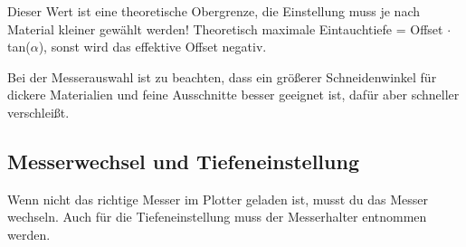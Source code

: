 \documentclass{\basedir/fablab-document}
\begin{document}
{ \footnotesize * Dieser Wert ist eine theoretische Obergrenze, die Einstellung muss je nach Material kleiner gewählt werden! Theoretisch maximale Eintauchtiefe = Offset $\cdot$ tan($\alpha$), sonst wird das effektive Offset negativ. }

Bei der Messerauswahl ist zu beachten, dass ein größerer Schneidenwinkel für dickere Materialien und feine Ausschnitte besser geeignet ist, dafür aber schneller verschleißt.
\newcommand{\messer}{
\shadedraw[left color=black!80!white!90!blue,right color=black!30!white] (-0.7,3) -- (-0.7,0) -- (-.2,0) -- (-.2,-2) -- (.7,0) -- (.7,3) -- cycle;
\fill[fill,color=black!20!white] (-.2,-2) -- (.7,0)  -- (.7,.3) --  (-.2,-1.7) -- cycle;
\draw[thick] (-0.7,3) -- (-0.7,0) -- (-.2,0) -- (-.2,-2) -- (.7,0) -- (.7,3) -- cycle;
}
\newcommand{\messerhalter}{
\draw[ultra thick,fill=white!90!black,fill opacity=50] (-2,2.5) -- (-2,-1) .. controls (-2,-1.66) and (2,-1.66) .. (2,-1) -- (2,2.5) -- cycle;
\node at (-.8,2) {Messerhalter}; 

\draw[dashed] (0,-1.6) -- (0,1.8);
\draw[->,very thick] (2.2,1.2) -- ++(1,0) ;
}
\begin{center}
\end{center}


\subsection{Messerwechsel und Tiefeneinstellung}

Wenn nicht das richtige Messer im Plotter geladen ist, musst du das Messer wechseln.
Auch für die Tiefeneinstellung muss der Messerhalter entnommen werden.

\label{messerwechsel}
\end{document}
